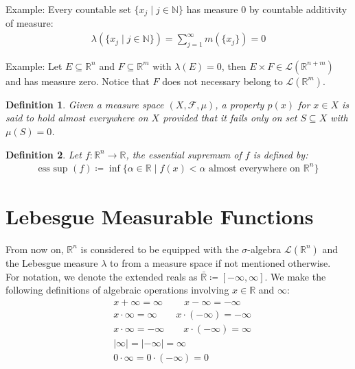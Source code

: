 \documentclass[11pt]{book}
\theoremstyle{break}
\theoremstyle{break}
\newtheorem{defn}{Definition}[corL]
\newcommand{\R}{\mathbb{R}}
\newcommand{\N}{\mathbb{N}}
\newcommand{\F}{\mathcal{F}}
\newcommand{\example}{\color{green}Example: \color{black}}
\begin{document}
\example Every countable set $\{x_j\mid j \in \N\}$ has measure $0$ by countable additivity of measure:
\begin{align*}
\lambda(\{x_j \mid j \in \N\}) = \sum_{j=1}^\infty m(\{x_j\}) = 0
\end{align*}  

\example Let $E\subseteq \R^n$ and $F \subseteq \R^m$ with $\lambda(E) = 0$, then $E \times F \in \mathcal{L}(\R^{n+m})$ and has measure zero. Notice that $F$ does not necessary belong to $\mathcal{L}(\R^m)$. \\

\begin{defn}
Given a measure space $(X,\F,\mu)$, a property $p(x)$ for $x \in X$ is said to hold almost everywhere on $X$ provided that it fails only on set $S \subseteq X$ with $\mu(S) = 0$. 
\end{defn}

\begin{defn}
Let $f:\R^n \to \R$, the essential supremum of $f$ is defined by:
\begin{align*}
\text{ess sup }(f)\coloneqq \inf\{ \alpha \in \R \mid f(x) <\alpha \text{ almost everywhere on } \R^n\}
\end{align*}
\end{defn}
\newpage

\section[Lebesgue Measurable Functions]{\color{red} Lebesgue Measurable Functions \color{black}}
From now on, $\R^n$ is considered to be equipped with the $\sigma$-algebra $\mathcal{L}(\R^n)$ and the Lebesgue measure $\lambda$ to from a measure space if not mentioned otherwise. \\

For notation, we denote the extended reals as $\bar{\R}\coloneqq [-\infty, \infty]$. We make the following definitions of algebraic operations involving $x \in \R$ and $\infty$:
\begin{align*}
&x+\infty = \infty \ \qquad x-\infty = -\infty \ \ \\
&x\cdot \infty = \infty \qquad x\cdot (-\infty) = -\infty \tag{if $x>0$}\\
&x\cdot \infty = -\infty \qquad x\cdot (-\infty) = \infty \tag{if $x<0$}\\
&|\infty| = |-\infty| = \infty \\
& 0 \cdot \infty = 0\cdot (-\infty) = 0
\end{align*}
\end{document}
